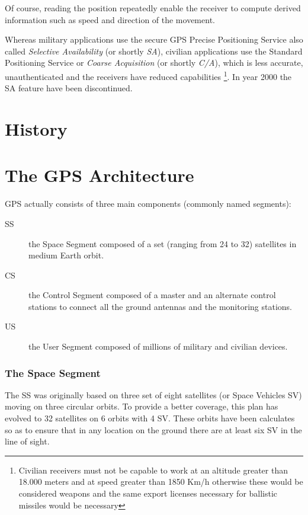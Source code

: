 \documentclass[PhD,binding=0.6cm]{dithesis}
\begin{document}
Of course, reading the position repeatedly enable the receiver to compute derived information such as speed and direction of the movement.
 
Whereas military applications use the secure GPS Precise Positioning Service also called \emph{Selective Availability} (or shortly \emph{SA}), civilian applications use the Standard Positioning Service or \emph{Coarse Acquisition} (or shortly \emph{C/A}), which is less accurate, unauthenticated and the receivers have reduced capabilities \footnote{Civilian receivers must not be capable to work at an altitude greater than 18.000 meters and at speed greater than 1850 Km/h otherwise these would be considered weapons and the same export licenses necessary for ballistic missiles would be necessary}. In year 2000 the SA feature have been discontinued.

\section{History}
 
\section{The GPS Architecture}

GPS actually consists of three main components (commonly named segments):
\begin{description}
\item [SS] the Space Segment composed of a set (ranging from 24 to 32) satellites in medium Earth orbit.
\item [CS] the Control Segment composed of a master and an alternate control stations to connect all the ground antennas and the monitoring stations.
\item [US] the User Segment composed of millions of military and civilian devices.
\end{description}

\subsubsection{The Space Segment}

The SS was originally based on three set of eight satellites (or Space Vehicles SV) moving on three circular orbits.
To provide a better coverage, this plan has evolved to 32 satellites on 6 orbits with 4 SV. These orbits have been calculates so as to ensure that in any location on the ground there are at least six SV in the line of sight.
\end{document}
